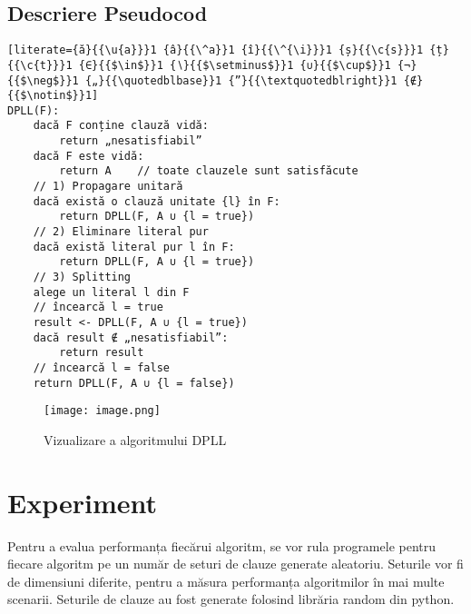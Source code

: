 \documentclass[12pt]{article}
\begin{document}
\subsection{Descriere Pseudocod}
\begin{lstlisting}[literate={ă}{{\u{a}}}1 {â}{{\^a}}1 {î}{{\^{\i}}}1 {ș}{{\c{s}}}1 {ț}{{\c{t}}}1 {∈}{{$\in$}}1 {∖}{{$\setminus$}}1 {∪}{{$\cup$}}1 {¬}{{$\neg$}}1 {„}{{\quotedblbase}}1 {”}{{\textquotedblright}}1 {∉}{{$\notin$}}1]
DPLL(F):
    dacă F conține clauză vidă:
        return „nesatisfiabil”
    dacă F este vidă:
        return A    // toate clauzele sunt satisfăcute
    // 1) Propagare unitară
    dacă există o clauză unitate {l} în F:
        return DPLL(F, A ∪ {l = true})
    // 2) Eliminare literal pur
    dacă există literal pur l în F:
        return DPLL(F, A ∪ {l = true})
    // 3) Splitting
    alege un literal l din F
    // încearcă l = true
    result <- DPLL(F, A ∪ {l = true})
    dacă result ∉ „nesatisfiabil”:
        return result
    // încearcă l = false
    return DPLL(F, A ∪ {l = false})
\end{lstlisting}
\begin{figure}
    \centering
    \texttt{[image: image.png]}
    \caption{Vizualizare a algoritmului DPLL}
    \label{sigma}
\end{figure}
\section{Experiment}
Pentru a evalua performanța fiecărui algoritm, se vor rula programele pentru fiecare algoritm pe un număr de seturi de clauze generate aleatoriu. Seturile vor fi de dimensiuni diferite, pentru a măsura performanța algoritmilor în mai multe scenarii. Seturile de clauze au fost generate folosind librăria random din python.
\end{document}
